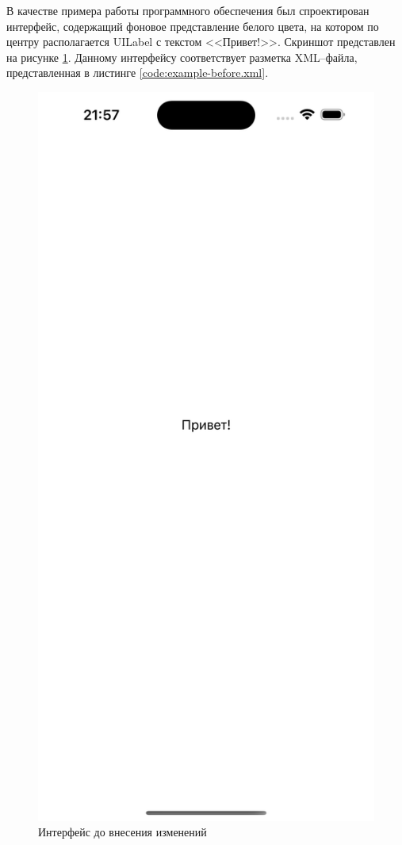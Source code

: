 В качестве примера работы программного обеспечения был спроектирован интерфейс, содержащий фоновое представление белого цвета, на котором по центру располагается UILabel с текстом <<Привет!>>. 
Скриншот представлен на рисунке \ref{fig:example-before}.
Данному интерфейсу соответствует разметка XML--файла, представленная в листинге \ref{code:example-before.xml}.
\clearpage
\begin{figure}[!htb]
	\centering
	\includegraphics[scale=0.13]{img/example-before.png}
	\caption{Интерфейс до внесения изменений}
	\label{fig:example-before}
\end{figure}

